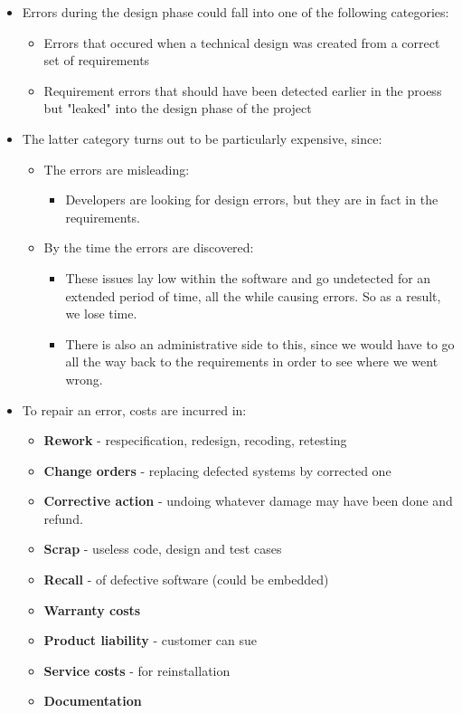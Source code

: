 \documentclass[12pt]{book}
\begin{document}
\begin{itemize}
  \item Errors during the design phase could fall into one of the following categories:
  \begin{itemize}
    \item Errors that occured when a technical design was created from a correct set of requirements
    \item Requirement errors that should have been detected earlier in the proess but "leaked" into the design phase of the project
  \end{itemize}

  \item The latter category turns out to be particularly expensive, since:
  \begin{itemize}
    \item The errors are misleading:
    \begin{itemize}
      \item Developers are looking for design errors, but they are in fact in the requirements.
    \end{itemize} 
    \item By the time the errors are discovered:
    \begin{itemize}
      \item These issues lay low within the software and go undetected for an extended period of time, all the while causing errors. So as a result, we lose time.
    \item There is also an administrative side to this, since we would have to go all the way back to the requirements in order to see where we went wrong.
    \end{itemize}
    
  \end{itemize} 

  \item To repair an error, costs are incurred in:
  \begin{itemize}
    \item \textbf{Rework} - respecification, redesign, recoding, retesting
    \item \textbf{Change orders} - replacing defected systems by corrected one
    \item \textbf{Corrective action} - undoing whatever damage may have been done and refund.
    \item \textbf{Scrap} - useless code, design and test cases
    \item \textbf{Recall} - of defective software (could be embedded)
    \item \textbf{Warranty costs}
    \item \textbf{Product liability} - customer can sue
    \item \textbf{Service costs} - for reinstallation
    \item \textbf{Documentation}
  \end{itemize} 
\end{itemize}
\end{document}
